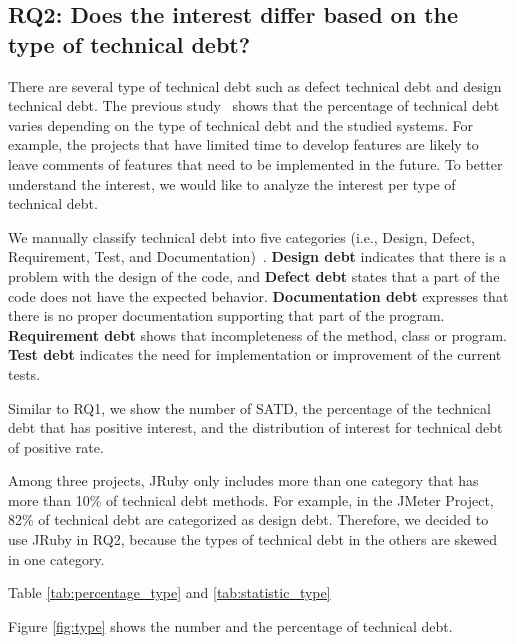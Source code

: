 
\subsection{RQ2: Does the interest differ based on the type of technical debt?}
There are several type of technical debt such as defect technical debt and design technical debt.
The previous study~\cite{Maldonado2015MTD} shows that the percentage of technical debt varies depending on the type of technical debt and the studied systems. For example, the projects that have limited time to develop features are likely to leave comments of features that need to be implemented in the future. 
To better understand the interest, we would like to analyze the interest per type of technical debt.

We manually classify technical debt into five categories (i.e., Design, Defect, Requirement, Test, and Documentation)~\cite{Maldonado2015MTD}. {\bf Design debt} indicates that there is a problem with the design of the code, and {\bf Defect debt} states that a part of the code does not have the expected behavior. {\bf Documentation debt} expresses that there is no proper documentation supporting that part of the program. {\bf Requirement debt} shows that incompleteness of the method, class or program. {\bf Test debt} indicates the need for implementation or improvement of the current tests.

Similar to RQ1, we show the number of SATD, the percentage of the technical debt that has positive interest, and the distribution of interest for technical debt of positive rate.

Among three projects, JRuby only includes more than one category that has more than 10\% of technical debt methods. For example, in the JMeter Project, 82\% of technical debt are categorized as design debt. Therefore, we decided to use JRuby in RQ2, because the types of technical debt in the others are skewed in one category.

Table \ref{tab:percentage_type} and \ref{tab:statistic_type}

Figure \ref{fig:type} shows the number and the percentage of technical debt. 


